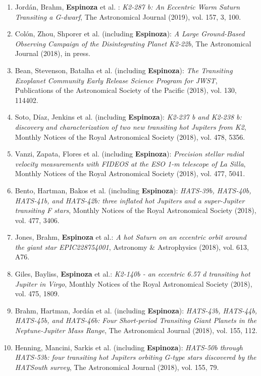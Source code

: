 \documentclass[12pt, a4paper]{article} %
\begin{document}
\begin{flushleft}
\begin{enumerate}
\item Jord\'an, Brahm, \textbf{Espinoza} et al. : \textit{K2-287 b: An Eccentric Warm Saturn Transiting a G-dwarf}, The Astronomical Journal (2019), vol. 157, 3, 100.
\item Col\'on, Zhou, Shporer et al. (including \textbf{Espinoza}): \textit{A Large Ground-Based Observing Campaign of the Disintegrating Planet K2-22b}, The Astronomical Journal (2018), in press.
\item Bean, Stevenson, Batalha et al. (including \textbf{Espinoza}): \textit{The Transiting Exoplanet Community Early Release Science Program for JWST}, Publications of the Astronomical Society of the Pacific (2018), vol. 130, 114402.
\item Soto, D\'iaz, Jenkins et al. (including \textbf{Espinoza}): \textit{K2-237 b and K2-238 b: discovery and characterization of two new transiting hot Jupiters from K2},  Monthly Notices of the Royal Astronomical Society (2018), vol. 478, 5356.
\item Vanzi, Zapata, Flores et al. (including \textbf{Espinoza}): \textit{Precision stellar radial velocity measurements with FIDEOS at the ESO 1-m telescope of La Silla},  Monthly Notices of the Royal Astronomical Society (2018), vol. 477, 5041.
\item Bento, Hartman, Bakos et al. (including \textbf{Espinoza}): \textit{HATS-39b, HATS-40b, HATS-41b, and HATS-42b: three inflated hot Jupiters and a super-Jupiter transiting F stars},  Monthly Notices of the Royal Astronomical Society (2018), vol. 477, 3406.
\item Jones, Brahm, \textbf{Espinoza} et al.: \textit{A hot Saturn on an eccentric orbit around the giant star EPIC228754001},  Astronomy \& Astrophysics (2018), vol. 613, A76.
\item Giles, Bayliss, \textbf{Espinoza} et al.: \textit{K2-140b - an eccentric 6.57 d transiting hot Jupiter in Virgo}, 
Monthly Notices of the Royal Astronomical Society (2018), vol. 475, 1809.
\item Brahm, Hartman, Jord\'an et al. (including \textbf{Espinoza}): \textit{	HATS-43b, HATS-44b, HATS-45b, and HATS-46b: Four Short-period Transiting Giant Planets in the Neptune-Jupiter Mass Range}, The Astronomical Journal (2018), vol. 155, 112.
\item Henning, Mancini, Sarkis et al. (including \textbf{Espinoza}): \textit{HATS-50b through HATS-53b: four transiting hot Jupiters orbiting G-type stars discovered by the HATSouth survey}, The Astronomical Journal (2018), vol. 155, 79.

\end{enumerate}
\end{flushleft}
\end{document}
